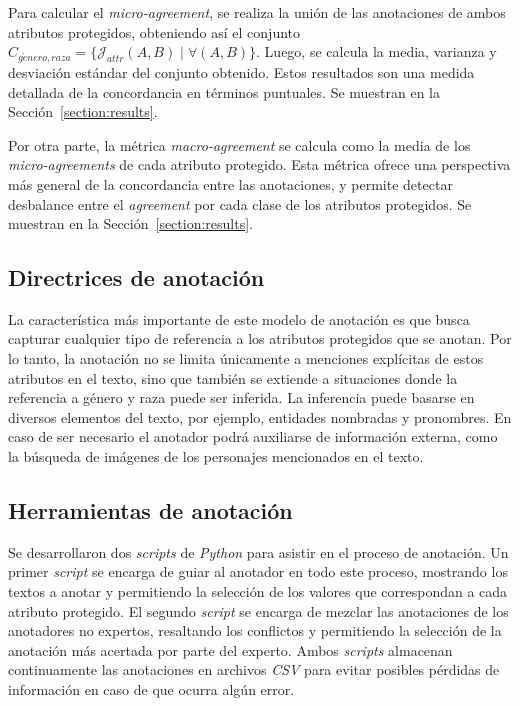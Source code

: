 Para calcular el \emph{micro-agreement}, se realiza la uni\'on de las anotaciones de ambos atributos protegidos, obteniendo as\'i
el conjunto $C_{g\acute{e}nero, raza} = \{\mathcal{J}_{attr}(A, B) \mid \forall (A, B)\}$. Luego, se calcula la media, varianza y
desviaci\'on est\'andar del conjunto obtenido. Estos resultados son una medida detallada de la concordancia en t\'erminos puntuales.
Se muestran en la Secci\'on~\ref{section:results}.

Por otra parte, la m\'etrica \emph{macro-agreement} se calcula como la media de los \emph{micro-agreements} de cada atributo protegido. 
Esta m\'etrica ofrece una perspectiva m\'as general de la concordancia entre las anotaciones, y permite detectar desbalance entre 
el \emph{agreement} por cada clase de los atributos protegidos. Se muestran en la Secci\'on~\ref{section:results}.

\subsection{Directrices de anotaci\'on}\label{section:annotation_guidelines}
La caracter\'istica m\'as importante de este modelo de anotaci\'on es que busca capturar cualquier tipo de referencia a los atributos 
protegidos que se anotan. Por lo tanto, la anotaci\'on no se limita \'unicamente a menciones expl\'icitas de estos atributos en el 
texto, sino que tambi\'en se extiende a situaciones donde la referencia a g\'enero y raza puede ser inferida. La inferencia puede 
basarse en diversos elementos del texto, por ejemplo, entidades nombradas y pronombres. En caso de ser necesario el anotador podr\'a
auxiliarse de informaci\'on externa, como la b\'usqueda de im\'agenes de los personajes mencionados en el texto.

\subsection{Herramientas de anotaci\'on}
Se desarrollaron dos \emph{scripts} de \emph{Python} para asistir en el proceso de anotaci\'on. Un primer \emph{script}
se encarga de guiar al anotador en todo este proceso, mostrando los textos a anotar y permitiendo la selecci\'on de los valores
que correspondan a cada atributo protegido. El segundo \emph{script} se encarga de mezclar las anotaciones de los anotadores 
no expertos, resaltando los conflictos y permitiendo la selecci\'on de la anotaci\'on m\'as acertada por parte del experto. 
Ambos \emph{scripts} almacenan continuamente las anotaciones en archivos \emph{CSV} para evitar posibles p\'erdidas de 
informaci\'on en caso de que ocurra alg\'un error.

